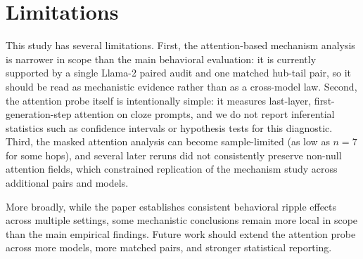 \section*{Limitations}

This study has several limitations. First, the attention-based mechanism analysis is narrower in scope than the main behavioral evaluation: it is currently supported by a single Llama-2 paired audit and one matched hub-tail pair, so it should be read as mechanistic evidence rather than as a cross-model law. Second, the attention probe itself is intentionally simple: it measures last-layer, first-generation-step attention on cloze prompts, and we do not report inferential statistics such as confidence intervals or hypothesis tests for this diagnostic. Third, the masked attention analysis can become sample-limited (as low as $n=7$ for some hops), and several later reruns did not consistently preserve non-null attention fields, which constrained replication of the mechanism study across additional pairs and models.

More broadly, while the paper establishes consistent behavioral ripple effects across multiple settings, some mechanistic conclusions remain more local in scope than the main empirical findings. Future work should extend the attention probe across more models, more matched pairs, and stronger statistical reporting.